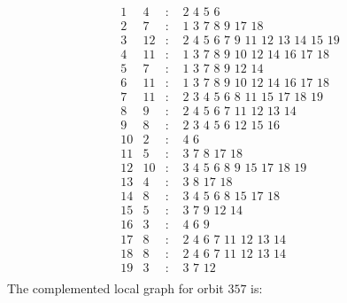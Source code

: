 \documentclass[12pt]{article}
\begin{document}
\begin{equation*}
\begin{array}{rrcl}
1&4&:&\,\,2\,\,4\,\,5\,\,6\\
2&7&:&\,\,1\,\,3\,\,7\,\,8\,\,9\,\,17\,\,18\\
3&12&:&\,\,2\,\,4\,\,5\,\,6\,\,7\,\,9\,\,11\,\,12\,\,13\,\,14\,\,15\,\,19\\
4&11&:&\,\,1\,\,3\,\,7\,\,8\,\,9\,\,10\,\,12\,\,14\,\,16\,\,17\,\,18\\
5&7&:&\,\,1\,\,3\,\,7\,\,8\,\,9\,\,12\,\,14\\
6&11&:&\,\,1\,\,3\,\,7\,\,8\,\,9\,\,10\,\,12\,\,14\,\,16\,\,17\,\,18\\
7&11&:&\,\,2\,\,3\,\,4\,\,5\,\,6\,\,8\,\,11\,\,15\,\,17\,\,18\,\,19\\
8&9&:&\,\,2\,\,4\,\,5\,\,6\,\,7\,\,11\,\,12\,\,13\,\,14\\
9&8&:&\,\,2\,\,3\,\,4\,\,5\,\,6\,\,12\,\,15\,\,16\\
10&2&:&\,\,4\,\,6\\
11&5&:&\,\,3\,\,7\,\,8\,\,17\,\,18\\
12&10&:&\,\,3\,\,4\,\,5\,\,6\,\,8\,\,9\,\,15\,\,17\,\,18\,\,19\\
13&4&:&\,\,3\,\,8\,\,17\,\,18\\
14&8&:&\,\,3\,\,4\,\,5\,\,6\,\,8\,\,15\,\,17\,\,18\\
15&5&:&\,\,3\,\,7\,\,9\,\,12\,\,14\\
16&3&:&\,\,4\,\,6\,\,9\\
17&8&:&\,\,2\,\,4\,\,6\,\,7\,\,11\,\,12\,\,13\,\,14\\
18&8&:&\,\,2\,\,4\,\,6\,\,7\,\,11\,\,12\,\,13\,\,14\\
19&3&:&\,\,3\,\,7\,\,12\\
\end{array}
\end{equation*}
The complemented local graph for orbit $357$ is:
\end{document}
